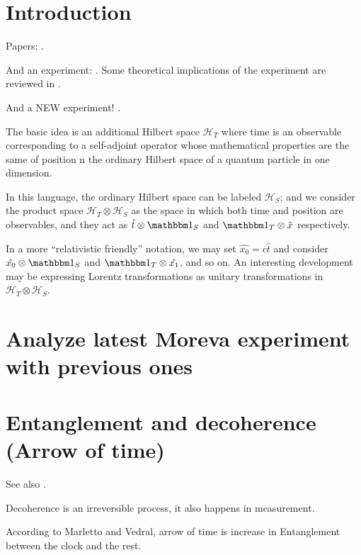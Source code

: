\section{Introduction}

Papers: \cite{Lloyd:Time, Marletto:Evolution, Prvanovic, Maccone:Pauli, RealisticClocks}.


And an experiment: \cite{Moreva:synthetic,Moreva:illustration}.
Some theoretical implications of the experiment are reviewed in
\cite{LeggettGarg+PageWootters}.

And a NEW experiment! \parencite{Moreva_position}.

The basic idea is an additional Hilbert space $\mathcal{H}_T$ where time is an observable
corresponding to
a self-adjoint operator whose mathematical properties are the same of position  n the
ordinary Hilbert space of a quantum particle in one dimension.

In this language, the ordinary Hilbert space can be labeled $\mathcal{H}_S$;
and we consider the product space $\mathcal{H}_T \otimes \mathcal{H}_S$ as
the space in which both time and position are observables, and they act as
$\hat{t} \otimes \idop_S$ and $\idop_T \otimes \hat{x}$
respectively.

\begin{remark}
  In a more ``relativistic friendly'' notation, we may set
  $\hat{x_0} = c\hat{t}$ and consider
  $\hat{x_0} \otimes \idop_S$ and $\idop_T \otimes \hat{x_1}$,
  and so on. An interesting development may be expressing
  Lorentz transformations as unitary transformations in
  $\mathcal{H}_T \otimes \mathcal{H}_S$.
\end{remark}

\iftodo

\section{Analyze latest Moreva experiment with previous ones}

\section{Entanglement and decoherence (Arrow of time)}
See also \cite{EntanglementVsDecoherence}.

Decoherence is an irreversible process, it also happens in measurement.

According to Marletto and Vedral, arrow of time is increase in Entanglement
between the clock and the rest.

